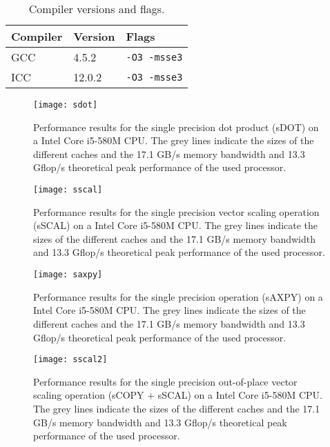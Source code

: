 \documentclass[12pt]{article}
\begin{document}
\begin{table}[h]
\begin{center}
\begin{tabular}{| l | l | l | }
  \hline                       
  Compiler & Version & Flags \\
  \hline                       
  GCC & 4.5.2 & \texttt{-O3 -msse3} \\
  ICC & 12.0.2 & \texttt{-O3 -msse3} \\
  \hline  
\end{tabular}
\end{center}
\caption{Compiler versions and flags.}
\label{cflags}
\end{table}

\begin{figure}
\texttt{[image: sdot]}
\caption{Performance results for the single precision dot product (sDOT) on a Intel Core i5-580M CPU.
The grey lines indicate the sizes of the different caches and the 17.1 GB/s memory bandwidth and
13.3 Gflop/s theoretical peak performance of the used processor.}

\label{i5sdot}
\end{figure}
\begin{figure}
\texttt{[image: sscal]}
\caption{Performance results for the single precision vector scaling operation (sSCAL) on a Intel Core i5-580M CPU.
The grey lines indicate the sizes of the different caches and the 17.1 GB/s memory bandwidth and
13.3 Gflop/s theoretical peak performance of the used processor.}
\label{i5sscal}
\end{figure}
\begin{figure}
\texttt{[image: saxpy]}
\caption{Performance results for the single precision operation  (sAXPY) on a Intel Core i5-580M CPU.
The grey lines indicate the sizes of the different caches and the 17.1 GB/s memory bandwidth and
13.3 Gflop/s theoretical peak performance of the used processor.}
\label{i5saxpy}
\end{figure}
\begin{figure}
\texttt{[image: sscal2]}
\caption{Performance results for the single precision out-of-place vector scaling operation (sCOPY + sSCAL) on a Intel Core i5-580M CPU.
The grey lines indicate the sizes of the different caches and the 17.1 GB/s memory bandwidth and
13.3 Gflop/s theoretical peak performance of the used processor.}
\label{i5sscal2}
\end{figure}
\end{document}
